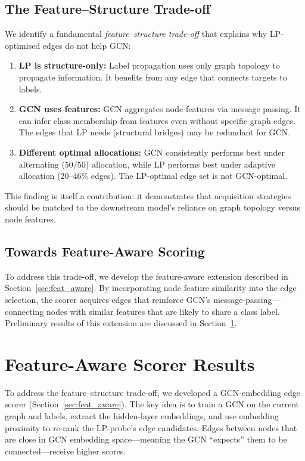 \documentclass[12pt,a4paper,oneside]{report}
\begin{document}
\subsection{The Feature--Structure Trade-off}

We identify a fundamental \emph{feature--structure trade-off} that explains why LP-optimised edges do not help GCN:

\begin{enumerate}[leftmargin=2em]
    \item \textbf{LP is structure-only:} Label propagation uses only graph topology to propagate information. It benefits from any edge that connects targets to labels.

    \item \textbf{GCN uses features:} GCN aggregates node features via message passing. It can infer class membership from features even without specific graph edges. The edges that LP needs (structural bridges) may be redundant for GCN.

    \item \textbf{Different optimal allocations:} GCN consistently performs best under alternating (50/50) allocation, while LP performs best under adaptive allocation (20--46\% edges). The LP-optimal edge set is not GCN-optimal.
\end{enumerate}

This finding is itself a contribution: it demonstrates that acquisition strategies should be matched to the downstream model's reliance on graph topology versus node features.

\subsection{Towards Feature-Aware Scoring}

To address this trade-off, we develop the feature-aware extension described in Section~\ref{sec:feat_aware}. By incorporating node feature similarity into the edge selection, the scorer acquires edges that reinforce GCN's message-passing---connecting nodes with similar features that are likely to share a class label. Preliminary results of this extension are discussed in Section~\ref{sec:feat_results}.

\section{Feature-Aware Scorer Results}
\label{sec:feat_results}

To address the feature--structure trade-off, we developed a GCN-embedding edge scorer (Section~\ref{sec:feat_aware}). The key idea is to train a GCN on the current graph and labels, extract the hidden-layer embeddings, and use embedding proximity to re-rank the LP-probe's edge candidates. Edges between nodes that are close in GCN embedding space---meaning the GCN ``expects'' them to be connected---receive higher scores.
\end{document}
